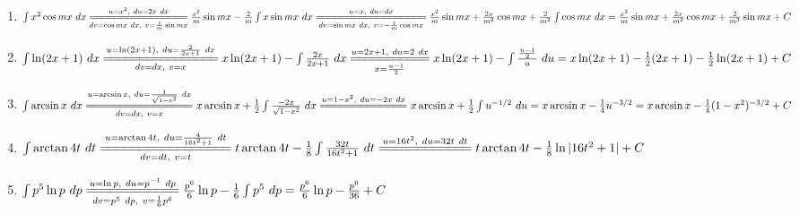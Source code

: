 \documentclass[a4]{article}
\begin{document}
\begin{enumerate}[label={\bf{}\arabic*}.]
\item%
	$\int x^2\cos mx\ dx\overset{u=x^2,\ du=2x\ dx}{\underset{dv=\cos mx\ dx,\ v=\frac{1}{m}\sin mx}{=\joinrel=\joinrel=\joinrel=\joinrel=\joinrel=\joinrel=\joinrel=\joinrel=\joinrel=\joinrel=\joinrel=\joinrel=\joinrel=\joinrel=\joinrel=}}\frac{x^2}{m}\sin mx-\frac{2}{m}\int x\sin mx\ dx\overset{u=x,\ du=dx}{\underset{dv=\sin mx\ dx,\ v=-\frac{1}{m}\cos mx}{=\joinrel=\joinrel=\joinrel=\joinrel=\joinrel=\joinrel=\joinrel=\joinrel=\joinrel=\joinrel=\joinrel=\joinrel=\joinrel=\joinrel=\joinrel=\joinrel=\joinrel=}}\frac{x^2}{m}\sin mx+\frac{2x}{m^2}\cos mx+\frac{2}{m^2}\int\cos mx\ dx=\frac{x^2}{m}\sin mx+\frac{2x}{m^2}\cos mx+\frac{2}{m^3}\sin mx+C$

\item%
	$\int\ln(2x+1)\ dx\overset{u=\ln(2x+1),\ du=\frac{2}{2x+1}\ dx}{\underset{dv=dx,\ v=x}{=\joinrel=\joinrel=\joinrel=\joinrel=\joinrel=\joinrel=\joinrel=\joinrel=\joinrel=\joinrel=\joinrel=\joinrel=\joinrel=\joinrel=\joinrel=}}x\ln(2x+1)-\int\frac{2x}{2x+1}\ dx\overset{u=2x+1,\ du=2\ dx}{\underset{x=\frac{u-1}{2}}{=\joinrel=\joinrel=\joinrel=\joinrel=\joinrel=\joinrel=\joinrel=\joinrel=\joinrel=\joinrel=}}x\ln(2x+1)-\int\frac{\frac{u-1}{2}}{u}\ du=x\ln(2x+1)-\frac{1}{2}(2x+1)-\frac{1}{2}\ln(2x+1)+C$

\item%
	$\int\arcsin x\ dx\overset{u=\arcsin x,\ du=\frac{1}{\sqrt{1-x^2}}\ dx}{\underset{dv=dx,\ v=x }{=\joinrel=\joinrel=\joinrel=\joinrel=\joinrel=\joinrel=\joinrel=\joinrel=\joinrel=\joinrel=\joinrel=\joinrel=\joinrel=\joinrel=\joinrel=}}x\arcsin x+\frac{1}{2}\int\frac{-2x}{\sqrt{1-x^2}}\ dx\overset{u=1-x^2,\ du=-2x\ dx}{=\joinrel=\joinrel=\joinrel=\joinrel=\joinrel=\joinrel=\joinrel=\joinrel=\joinrel=\joinrel=\joinrel=\joinrel=}x\arcsin x+\frac{1}{2}\int u^{-1/2}\ du=x\arcsin x-\frac{1}{4}u^{-3/2}=x\arcsin x-\frac{1}{4}(1-x^2)^{-3/2}+C$

\item%
	$\int\arctan4t\ dt\overset{u=\arctan4t,\ du=\frac{4}{16t^2+1}\ dt}{\underset{dv=dt,\ v=t}{=\joinrel=\joinrel=\joinrel=\joinrel=\joinrel=\joinrel=\joinrel=\joinrel=\joinrel=\joinrel=\joinrel=\joinrel=\joinrel=\joinrel=\joinrel=\joinrel=}}t\arctan4t-\frac{1}{8}\int\frac{32t}{16t^2+1}\ dt\overset{u=16t^2,\ du=32t\ dt}{=\joinrel=\joinrel=\joinrel=\joinrel=\joinrel=\joinrel=\joinrel=\joinrel=\joinrel=\joinrel=\joinrel=}t\arctan4t-\frac{1}{8}\ln|16t^2+1|+C$

\item%
	$\int p^5\ln p\ dp\overset{u=\ln p,\ du=p^{-1}\ dp}{\underset{dv=p^5\ dp,\ v=\frac{1}{6}p^6}{=\joinrel=\joinrel=\joinrel=\joinrel=\joinrel=\joinrel=\joinrel=\joinrel=\joinrel=\joinrel=\joinrel=}}\frac{p^6}{6}\ln p-\frac{1}{6}\int p^5\ dp=\frac{p^6}{6}\ln p-\frac{p^6}{36}+C$


\end{enumerate}
\end{document}
